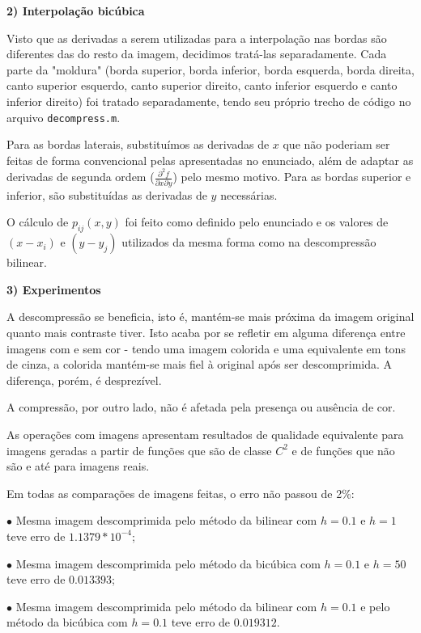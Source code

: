 \documentclass{article}
\begin{document}
\bigskip
\textbf{\large{2) Interpolação bicúbica}}

\quad Visto que as derivadas a serem utilizadas para a interpolação nas bordas são diferentes das do resto da imagem, decidimos tratá-las separadamente. Cada parte da "moldura" (borda superior, borda inferior, borda esquerda, borda direita, canto superior esquerdo, canto superior direito, canto inferior esquerdo e canto inferior direito) foi tratado separadamente, tendo seu próprio trecho de código no arquivo \texttt{decompress.m}.


\quad Para as bordas laterais, substituímos as derivadas de $x$ que não poderiam ser feitas de forma convencional pelas apresentadas no enunciado, além de adaptar as derivadas de segunda ordem ($\frac{\partial^{2}f}{\partial x \partial y}$) pelo mesmo motivo. Para as bordas superior e inferior, são substituídas as derivadas de $y$ necessárias.

\quad O cálculo de $p_{ij}(x, y)$ foi feito como definido pelo enunciado e os valores de $(x - x_{i})$ e $(y - y_{j})$ utilizados da mesma forma como na descompressão bilinear.

\bigskip
\textbf{\Large{3) Experimentos}}

\quad A descompressão se beneficia, isto é, mantém-se mais próxima da imagem original quanto mais contraste tiver. Isto acaba por se refletir em alguma diferença entre imagens com e sem cor - tendo uma imagem colorida e uma equivalente em tons de cinza, a colorida mantém-se mais fiel à original após ser descomprimida. A diferença, porém, é desprezível.

\quad A compressão, por outro lado, não é afetada pela presença ou ausência de cor.

\quad As operações com imagens apresentam resultados de qualidade equivalente para imagens geradas a partir de funções que são de classe $C^{2}$ e de funções que não são e até para imagens reais.

\quad Em todas as comparações de imagens feitas, o erro não passou de 2\%:

\qquad $\bullet$ Mesma imagem descomprimida pelo método da bilinear com $h = 0.1$ e $h = 1$ teve erro de $1.1379 * 10^{-4}$;

\qquad $\bullet$ Mesma imagem descomprimida pelo método da bicúbica com $h = 0.1$ e $h = 50$ teve erro de $0.013393$;

\qquad $\bullet$ Mesma imagem descomprimida pelo método da bilinear com $h = 0.1$ e pelo método da bicúbica com $h = 0.1$ teve erro de $0.019312$.
\end{document}
